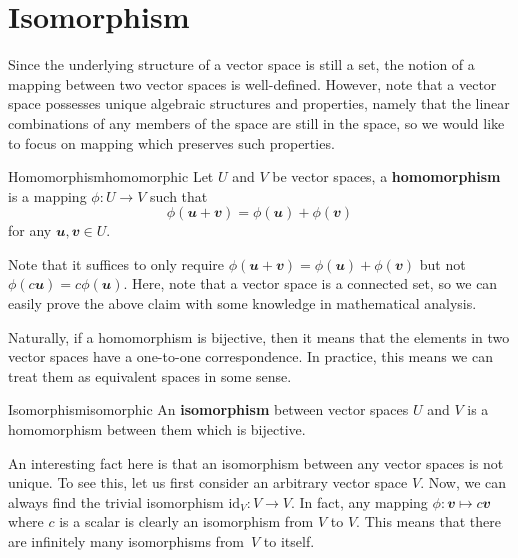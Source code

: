 \documentclass[math, code]{amznotes}
\theoremstyle{remark}
\begin{document}
\section{Isomorphism}
Since the underlying structure of a vector space is still a set, the notion of a mapping between two vector spaces is well-defined. However, note that a vector space possesses unique algebraic structures and properties, namely that the linear combinations of any members of the space are still in the space, so we would like to focus on mapping which preserves such properties.
\begin{dfnbox}{Homomorphism}{homomorphic}
    Let $U$ and $V$ be vector spaces, a {\color{red} \textbf{homomorphism}} is a mapping $\phi \colon U \to V$ such that
    \begin{equation*}
        \phi(\mathbfit{u + v}) = \phi(\mathbfit{u}) + \phi(\mathbfit{v})
    \end{equation*}
    for any $\mathbfit{u}, \mathbfit{v} \in U$.
\end{dfnbox}
Note that it suffices to only require $\phi(\mathbfit{u + v}) = \phi(\mathbfit{u}) + \phi(\mathbfit{v})$ but not $\phi(c\mathbfit{u}) = c\phi(\mathbfit{u})$. Here, note that a vector space is a connected set, so we can easily prove the above claim with some knowledge in mathematical analysis.

Naturally, if a homomorphism is bijective, then it means that the elements in two vector spaces have a one-to-one correspondence. In practice, this means we can treat them as equivalent spaces in some sense.
\begin{dfnbox}{Isomorphism}{isomorphic}
    An {\color{red} \textbf{isomorphism}} between vector spaces $U$ and $V$ is a homomorphism between them which is bijective.
\end{dfnbox}
An interesting fact here is that an isomorphism between any vector spaces is not unique. To see this, let us first consider an arbitrary vector space $V$. Now, we can always find the trivial isomorphism $\mathrm{id}_V \colon V \to V$. In fact, any mapping $\phi \colon \mathbfit{v} \mapsto c\mathbfit{v}$ where $c$ is a scalar is clearly an isomorphism from $V$ to $V$. This means that there are infinitely many isomorphisms from~$V$ to itself.
\end{document}
